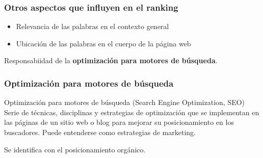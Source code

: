 \documentclass[
10pt, %
aspectratio=169, %
]{beamer}
\begin{document}
	\begin{frame}
		
		\frametitle{Otros aspectos que influyen en el ranking}
		
		\begin{itemize}
			\item Relevancia de las palabras en el contexto general
			\item Ubicación de las palabras en el cuerpo de la página web
		\end{itemize}
		
		\pause
		\vspace{2\baselineskip}
		Responsabiidad de la \textbf{optimización para motores de búsqueda}.
		
	\end{frame}
	
	\begin{frame}
		
		\frametitle{Optimización para motores de búsqueda}
		
		\begin{alertblock}{Optimización para motores de búsqueda (Search Engine Optimization, SEO)}
			Serie de técnicas, disciplinas y estrategias de optimización que se implementan en las páginas de un sitio web o blog para mejorar su posicionamiento en los buscadores. Puede entenderse como estrategias de marketing.
		\end{alertblock}
		
		\vspace{2\baselineskip}
		
		Se identifica con el posicionamiento orgánico.
		
	\end{frame}
	
\end{document}
